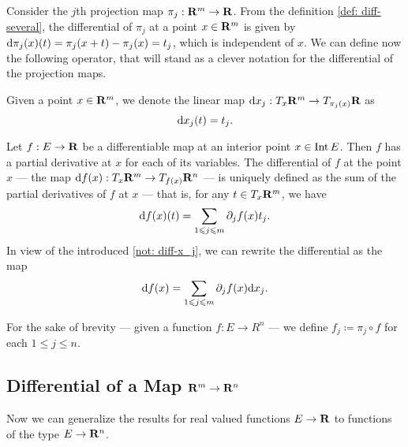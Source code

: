 Consider the \(j\)th projection map \(\pi_j: \mathbf{R}^m \to \mathbf{R}\). From the definition
\cref{def: diff-several}, the differential of \(\pi_j\) at a point \(x \in
\mathbf{R}^m\) is given by \(\mathrm{d} \pi_j(x)(t) = \pi_j(x + t) - \pi_j(x) = t_j\), which
is independent of \(x\). We can define now the following operator, that will
stand as a clever notation for the differential of the projection maps.

\begin{notation}\label{not: diff-x_j}
    Given a point \(x \in \mathbf{R}^m\), we denote the linear map \(\mathrm{d} x_j: T_x\mathbf{R}^m
    \to T_{\pi_j(x)}\mathbf{R}\) as
    \[
        \mathrm{d} x_j(t) = t_j.
    \]
\end{notation}

\begin{proposition}\label{prop: differential}
    Let \(f: E \to \mathbf{R}\) be a differentiable map at an interior point \(x \in \operatorname{Int}
    E\). Then \(f\) has a partial derivative at \(x\) for each of its variables.
    The differential of \(f\) at the point \(x\) --- the map \(\mathrm{d} f(x): T_x\mathbf{R}^m
    \to T_{f(x)}\mathbf{R}^n\) --- is uniquely defined as the sum of the partial
    derivatives of \(f\) at \(x\) --- that is, for any \(t \in T_x\mathbf{R}^m\), we have
    \[
        \mathrm{d} f(x)(t) = \sum_{1 \leqslant j \leqslant m} \partial_j f(x) t_j.
    \]
    In view of the introduced \cref{not: diff-x_j}, we can rewrite the
    differential as the map
    \[
        \mathrm{d} f(x) = \sum_{1 \leqslant j \leqslant m} \partial_j f(x) \mathrm{d} x_j.
    \]
\end{proposition}

\begin{notation}
    For the sake of brevity --- given a function \(f: E \to R^n\) --- we define
    \(f_j \coloneq \pi_j \circ f\) for each \(1 \leq j \leq n\).
\end{notation}

\subsection{Differential of a Map \texorpdfstring{\(\mathbf{R}^m \to \mathbf{R}^n\)}{Rm to Rn}}

Now we can generalize the results for real valued functions \(E \to \mathbf{R}\) to
functions of the type \(E \to \mathbf{R}^n\).

